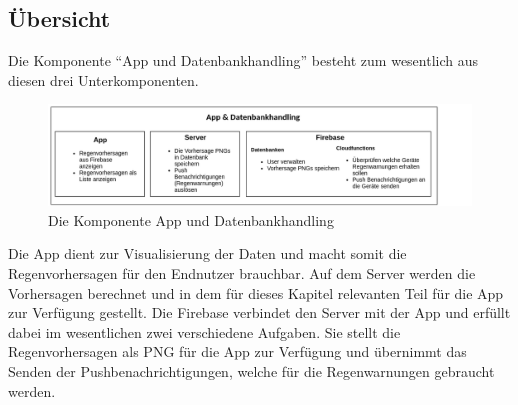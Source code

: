 \subsection{Übersicht}\label{übersicht}
Die Komponente “App und Datenbankhandling” besteht zum wesentlich aus diesen drei Unterkomponenten.  

\begin{figure}[h]
 \centering
 \includegraphics[width=1\textwidth,angle=0]{abb/app_datenbank_komponente_uebersicht}
 \caption[Komponentenübersicht App und Datenbankhandling]{Die Komponente App und Datenbankhandling}
\label{fig:Beschreibung}
\end{figure}

Die App dient zur Visualisierung der Daten und macht somit die Regenvorhersagen für den Endnutzer brauchbar. 
Auf dem Server werden die Vorhersagen berechnet und in dem für dieses Kapitel relevanten Teil
für die App zur Verfügung gestellt. 
Die Firebase verbindet den Server mit der App und erfüllt dabei im wesentlichen zwei verschiedene Aufgaben. 
Sie stellt die Regenvorhersagen als PNG für die App zur Verfügung und übernimmt das  Senden der Pushbenachrichtigungen,
welche für die Regenwarnungen gebraucht werden.
 
